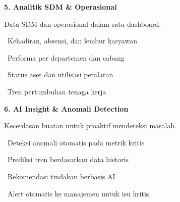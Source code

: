 \documentclass[a4paper]{article}
\begin{document}
\vspace{8pt}

\noindent
\begin{minipage}[t]{0.485\textwidth}
    \colorbox{OrangePrimary}{%
        \begin{minipage}{\dimexpr\textwidth-14pt}
            \vspace{5pt}
            {\fontsize{10}{13}\selectfont\bfseries\color{White} 5. Analitik SDM \& Operasional}
            \vspace{5pt}
        \end{minipage}}
    \vspace{5pt}
    {\fontsize{9}{12}\selectfont\color{TextDark}%
    Data SDM dan operasional dalam satu dashboard.\par\vspace{3pt}
    \textbullet\ Kehadiran, absensi, dan lembur karyawan\par\vspace{2pt}%
    \textbullet\ Performa per departemen dan cabang\par\vspace{2pt}%
    \textbullet\ Status aset dan utilisasi peralatan\par\vspace{2pt}%
    \textbullet\ Tren pertumbuhan tenaga kerja}%
\end{minipage}%
\hfill
\begin{minipage}[t]{0.485\textwidth}
    \colorbox{IndigoDark}{%
        \begin{minipage}{\dimexpr\textwidth-14pt}
            \vspace{5pt}
            {\fontsize{10}{13}\selectfont\bfseries\color{White} 6. AI Insight \& Anomali Detection}
            \vspace{5pt}
        \end{minipage}}
    \vspace{5pt}
    {\fontsize{9}{12}\selectfont\color{TextDark}%
    Kecerdasan buatan untuk proaktif mendeteksi masalah.\par\vspace{3pt}
    \textbullet\ Deteksi anomali otomatis pada metrik kritis\par\vspace{2pt}%
    \textbullet\ Prediksi tren berdasarkan data historis\par\vspace{2pt}%
    \textbullet\ Rekomendasi tindakan berbasis AI\par\vspace{2pt}%
    \textbullet\ Alert otomatis ke manajemen untuk isu kritis}%
\end{minipage}
\end{document}
